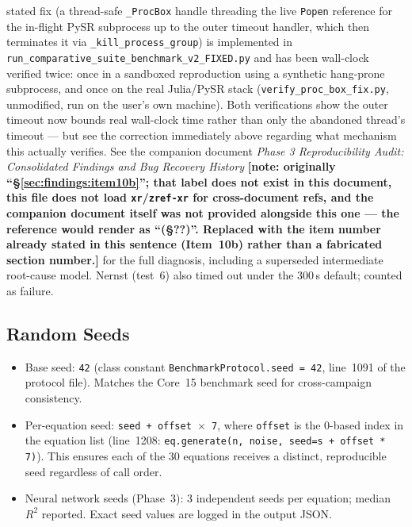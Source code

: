 \documentclass[twoside,11pt]{article}
\begin{document}
stated fix (a thread-safe \texttt{\_ProcBox}
handle threading the live \texttt{Popen} reference for the in-flight PySR
subprocess up to the outer timeout handler, which then terminates it via
\texttt{\_kill\_process\_group}) is implemented in
\texttt{run\_comparative\_suite\_benchmark\_v2\_FIXED.py} and has been
wall-clock verified twice: once in a sandboxed reproduction using a
synthetic hang-prone subprocess, and once on the real Julia/PySR stack
(\texttt{verify\_proc\_box\_fix.py}, unmodified, run on the user's own
machine). Both verifications show the outer timeout now bounds real
wall-clock time rather than only the abandoned thread's timeout --- but
see the correction immediately above regarding what mechanism this
actually verifies. See the
companion document \emph{Phase 3 Reproducibility Audit: Consolidated
Findings and Bug Recovery History} \textbf{[note: originally
``\S\ref{sec:findings:item10b}''; that label does not exist in this
document, this file does not load \texttt{xr}/\texttt{zref-xr} for
cross-document refs, and the companion document itself was not provided
alongside this one --- the reference would render as ``(\S??)''. Replaced
with the item number already stated in this sentence (Item~10b) rather
than a fabricated section number.]} for the
full diagnosis, including a superseded intermediate root-cause model.
Nernst (test~6) also timed out under the 300\,s default; counted as failure.

\subsection*{Random Seeds}

\begin{itemize}
  \item Base seed: \texttt{42} (class constant
    \texttt{BenchmarkProtocol.seed = 42}, line~1091 of the protocol file).
    Matches the Core~15 benchmark seed for cross-campaign consistency.
  \item Per-equation seed: \texttt{seed + offset $\times$ 7}, where
    \texttt{offset} is the 0-based index in the equation list
    (line~1208: \texttt{eq.generate(n, noise, seed=s + offset * 7)}).
    This ensures each of the 30 equations receives a distinct, reproducible
    seed regardless of call order.
  \item Neural network seeds (Phase~3): 3 independent seeds per equation;
    median $R^2$ reported. Exact seed values are logged in the output JSON.
\end{itemize}
\end{document}
